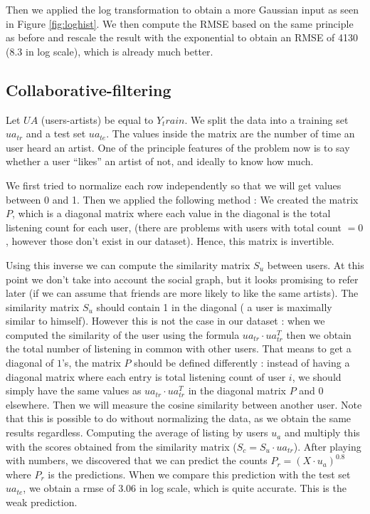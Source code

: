 \documentclass{article} %
\begin{document}
Then we applied the log transformation to obtain a more Gaussian input as seen in Figure \ref{fig:loghist}. We then compute the RMSE based on the same principle as before and rescale the result with the exponential to obtain an RMSE of 4130 (8.3 in log scale), which is already much better.

\subsection{Collaborative-filtering}
Let $UA$ (users-artists) be equal to $Y_train$. We split the data into a training set $ua_{tr}$ and a test set $ua_{te}$. The values inside the matrix are the number of time an user heard an artist. One of the principle features of the problem now is to say whether a user “likes” an artist of not, and ideally to know how much.

We first tried to normalize each row independently so that we will get values between 0 and 1.  Then we applied the following method : We created the matrix $P$, which is a diagonal matrix where each value in the diagonal is the total listening count for each user, (there are problems with users with total count $= 0$, however those don’t exist in our dataset). Hence, this matrix is invertible.

Using this inverse we can compute the similarity matrix $S_u$ between users. At this point we don’t take into account the social graph, but it looks promising to refer later (if we can assume that friends are more likely to like the same artists). The similarity matrix $S_u$ should contain 1 in the diagonal ( a user is maximally similar to himself). However this is not the case in our dataset : when we computed the similarity of the user using the formula $ua_{tr}\cdot ua_{tr}^T$ then we obtain the total number of listening in common with other users. That means to get a diagonal of $1$’s, the matrix $P$ should be defined differently : instead of having a diagonal matrix where each entry is  total listening count of user $i$, we should simply have the same values as $ua_{tr} \cdot ua_{tr}^T$ in the diagonal matrix $P$ and $0$ elsewhere. Then we will measure the cosine similarity between another user. Note that this is possible to do without normalizing the data, as we obtain the same results regardless. Computing the average of listing by users $u_a$ and multiply this with the scores obtained from the similarity matrix ($S_c = S_u \cdot ua_{tr}$). After playing with numbers, we discovered that we can predict the counts $P_r = (X\cdot u_a)^{0.8}$ where $P_r$ is the predictions. When we compare this prediction with the test set $ua_{te}$, we obtain a rmse of $3.06$ in log scale, which is quite accurate. This is the weak prediction.
\end{document}
